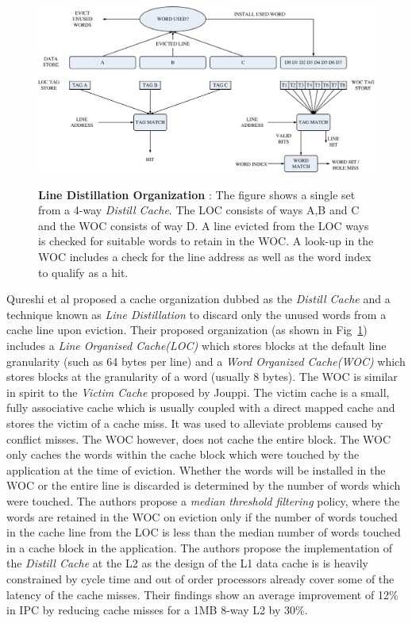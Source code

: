 \begin{figure}[h]
  \centering
  \includegraphics[width=\textwidth]{files/Figures/06-LDIS.pdf}
  \\
  \caption[Line Distillation]{\textbf{Line Distillation Organization} : The figure shows a single set from a 4-way \textit{Distill Cache}. The LOC consists of ways A,B and C and the WOC consists of way D. A line evicted from the LOC ways is checked for suitable words to retain in the WOC. A look-up in the WOC includes a check for the line address as well as the word index to qualify as a hit.}
  \label{fig:ldis}
\end{figure}

Qureshi et al\cite{Qureshi:2007:LDIS} proposed a cache organization dubbed as the \textit{Distill Cache} and a technique known as \textit{Line Distillation} to discard only the unused words from a cache line upon eviction. Their proposed organization (as shown in Fig~\ref{fig:ldis}) includes a \textit{Line Organised Cache(LOC)} which stores blocks at the default line granularity (such as 64 bytes per line) and a \textit{Word Organized Cache(WOC)} which stores blocks at the granularity of a word (usually 8 bytes). The WOC is similar in spirit to the \textit{Victim Cache}\cite{Jouppi:1990:IDC:325164.325162} proposed by Jouppi. The victim cache is a small, fully associative cache which is usually coupled with a direct mapped cache and stores the victim of a cache miss. It was used to alleviate problems caused by conflict misses. The WOC however, does not cache the entire block. The WOC only caches the words within the cache block which were touched by the application at the time of eviction. Whether the words will be installed in the WOC or the entire line is discarded is determined by the number of words which were touched. The authors propose a \textit{median threshold filtering} policy, where the words are retained in the WOC on eviction only if the number of words touched in the cache line from the LOC is less than the median number of words touched in a cache block in the application. The authors propose the implementation of the \textit{Distill Cache} at the L2 as the design of the L1 data cache is is heavily constrained by cycle time and out of order processors already cover some of the latency of the cache misses. Their findings show an average improvement of 12\% in IPC by reducing cache misses for a 1MB 8-way L2 by 30\%.

